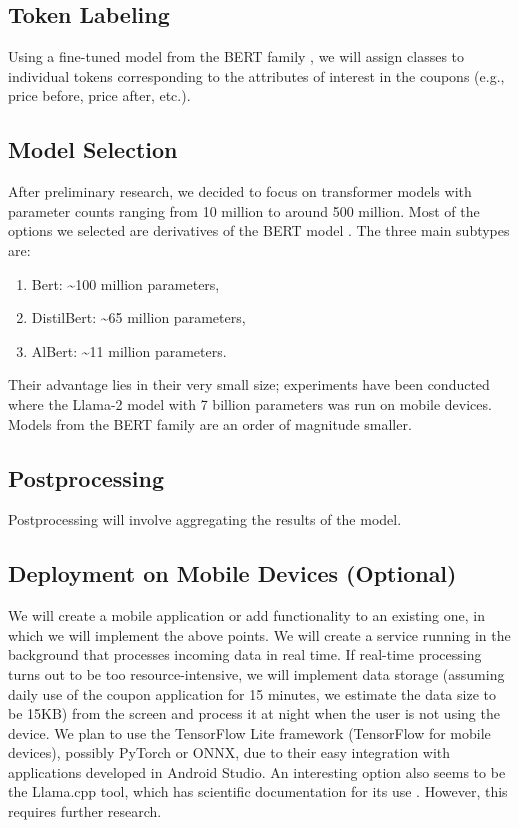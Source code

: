 \documentclass[12pt]{article}
\begin{document}
\subsection*{Token Labeling}
Using a fine-tuned model from the BERT family \cite{devlin2019bertpretrainingdeepbidirectional}, we will assign classes to individual tokens corresponding to the attributes of interest in the coupons (e.g., price before, price after, etc.).
    
\subsection*{Model Selection}
After preliminary research, we decided to focus on transformer models with parameter counts ranging from 10 million to around 500 million. Most of the options we selected are derivatives of the BERT model \cite{devlin2019bertpretrainingdeepbidirectional}. The three main subtypes are:
\begin{enumerate}
    \item Bert: \textasciitilde100 million parameters,
    \item DistilBert: \textasciitilde65 million parameters,
    \item AlBert: \textasciitilde11 million parameters.
\end{enumerate}
Their advantage lies in their very small size; experiments \cite{LLMmobile2024} have been conducted where the Llama-2 model with 7 billion parameters was run on mobile devices. Models from the BERT family are an order of magnitude smaller.

\subsection*{Postprocessing}
Postprocessing will involve aggregating the results of the model.
    
\subsection*{Deployment on Mobile Devices (Optional)}
We will create a mobile application or add functionality to an existing one, in which we will implement the above points. We will create a service running in the background that processes incoming data in real time. If real-time processing turns out to be too resource-intensive, we will implement data storage (assuming daily use of the coupon application for 15 minutes, we estimate the data size to be 15KB) from the screen and process it at night when the user is not using the device. We plan to use the TensorFlow Lite framework (TensorFlow for mobile devices), possibly PyTorch or ONNX, due to their easy integration with applications developed in Android Studio. An interesting option also seems to be the Llama.cpp tool, which has scientific documentation for its use \cite{LLMmobile2024}. However, this requires further research. 
\end{document}
